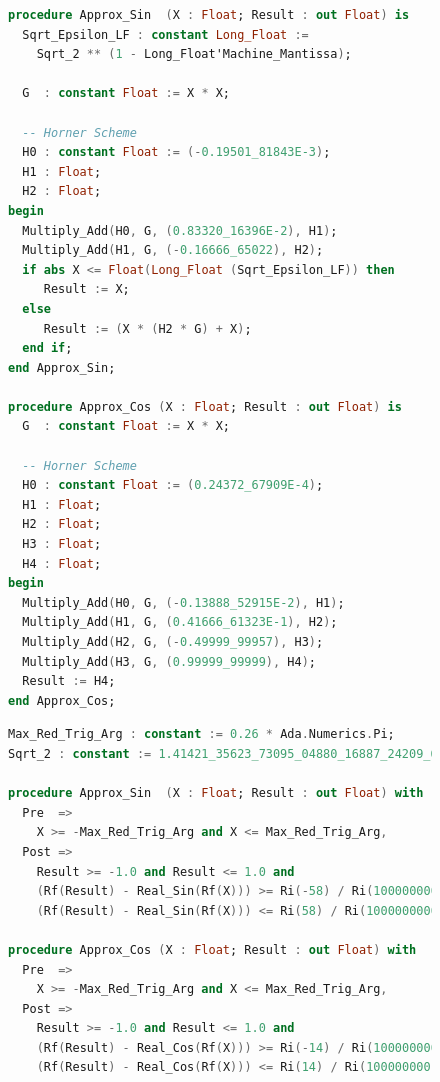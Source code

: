 \documentclass[runningheads]{llncs}
\begin{document}
\begin{figure}[p]
\vspace{-2ex}
\begin{lstlisting}[caption=Approx\_Sin and Approx\_Cos Implementation, language=ada, label={code:HIEApproxImpl},basicstyle=\fontsize{7.5}{9pt}\tt]
procedure Approx_Sin  (X : Float; Result : out Float) is
  Sqrt_Epsilon_LF : constant Long_Float :=
    Sqrt_2 ** (1 - Long_Float'Machine_Mantissa); 

  G  : constant Float := X * X;
  
  -- Horner Scheme
  H0 : constant Float := (-0.19501_81843E-3);
  H1 : Float;
  H2 : Float;
begin
  Multiply_Add(H0, G, (0.83320_16396E-2), H1);
  Multiply_Add(H1, G, (-0.16666_65022), H2);
  if abs X <= Float(Long_Float (Sqrt_Epsilon_LF)) then
     Result := X;
  else
     Result := (X * (H2 * G) + X);
  end if;
end Approx_Sin;

procedure Approx_Cos (X : Float; Result : out Float) is
  G  : constant Float := X * X;
  
  -- Horner Scheme
  H0 : constant Float := (0.24372_67909E-4);	
  H1 : Float;
  H2 : Float;
  H3 : Float;
  H4 : Float;
begin
  Multiply_Add(H0, G, (-0.13888_52915E-2), H1);
  Multiply_Add(H1, G, (0.41666_61323E-1), H2);
  Multiply_Add(H2, G, (-0.49999_99957), H3);
  Multiply_Add(H3, G, (0.99999_99999), H4);
  Result := H4;
end Approx_Cos;
\end{lstlisting}
  
\begin{lstlisting}[caption=Approx\_Sin and Approx\_Cos Specification, language=ada, label={code:HIEApproxSpec},basicstyle=\fontsize{7.5}{9pt}\tt]
Max_Red_Trig_Arg : constant := 0.26 * Ada.Numerics.Pi;
Sqrt_2 : constant := 1.41421_35623_73095_04880_16887_24209_69807_85696;

procedure Approx_Sin  (X : Float; Result : out Float) with
  Pre  =>
    X >= -Max_Red_Trig_Arg and X <= Max_Red_Trig_Arg,
  Post =>
    Result >= -1.0 and Result <= 1.0 and
    (Rf(Result) - Real_Sin(Rf(X))) >= Ri(-58) / Ri(1000000000) and
    (Rf(Result) - Real_Sin(Rf(X))) <= Ri(58) / Ri(1000000000);

procedure Approx_Cos (X : Float; Result : out Float) with
  Pre  =>
    X >= -Max_Red_Trig_Arg and X <= Max_Red_Trig_Arg,
  Post =>
    Result >= -1.0 and Result <= 1.0 and
    (Rf(Result) - Real_Cos(Rf(X))) >= Ri(-14) / Ri(100000000) and
    (Rf(Result) - Real_Cos(Rf(X))) <= Ri(14) / Ri(100000000);
\end{lstlisting}
\vspace{-2ex}
\end{figure}
\end{document}
